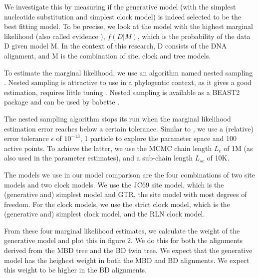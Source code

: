 \begin{itemize}
We investigate this by measuring if the generative model (with the simplest
nucleotide substitution and simplest clock model) is indeed selected 
to be the best fitting model. 
To be precise, we look at the model 
with the highest marginal likelihood 
(also called evidence \cite{mackay2003information}),
$f(D|M)$, which is the probability of the data D given model M.
In the context of this research, D consists of the DNA alignment,
and M is the combination of site, clock and tree models.

To estimate the marginal likelihood, 
we use an algorithm named nested sampling \cite{skilling2006nested}.
Nested sampling is attractive to use
in a phylogentic context, as it gives a good estimation,
requires little tuning \cite{maturana2018}.
Nested sampling is available as a BEAST2 package
and can be used by babette \cite{babette}.

The nested sampling algorithm stops its run 
when the marginal likelihood estimation error 
reaches below a certain tolerance.  
Similar to \cite{maturana2018},
we use a (relative) error tolerance $\epsilon$ of $10^{-13}$,
1 particle to explore the parameter space
and 100 active points. 
To achieve the latter, we use the MCMC chain length $L_c$ of 1M 
(as also used in the parameter estimates),
and a sub-chain length $L_{sc}$ of 10K.

The models we use in our model comparison are the four combinations
of two site models and two clock models. We use the JC69 site model, which
is the (generative and) simplest model and GTR, the site model with most
degrees of freedom. For the clock models, we use the strict clock model,
which is the (generative and) simplest clock model, and the RLN clock model.

From these four marginal likelihood estimates, we calculate the weight of
the generative model and plot this in figure 2. We do this for both the 
alignments derived from the MBD tree and the BD twin tree. We expect that
the generative model has the heighest weight in both the MBD and BD alignments.
We expect this weight to be higher in the BD alignments.

\end{itemize}

